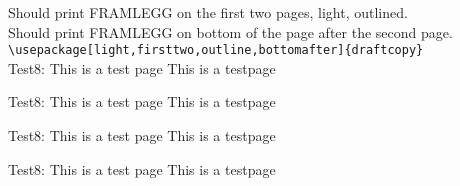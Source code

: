 \documentclass[a4paper,nynorsk]{article}
\newcommand{\xx}{
Test8: This is a test page \thepage \vfill
This is a testpage \thepage \newpage
}
\begin{document}
Should print FRAMLEGG on the first two pages, light, outlined.\\
Should print FRAMLEGG on bottom of the page after the second page.\\
\verb|\usepackage[light,firsttwo,outline,bottomafter]{draftcopy}|\\
\xx\xx\xx\xx
\end{document}
